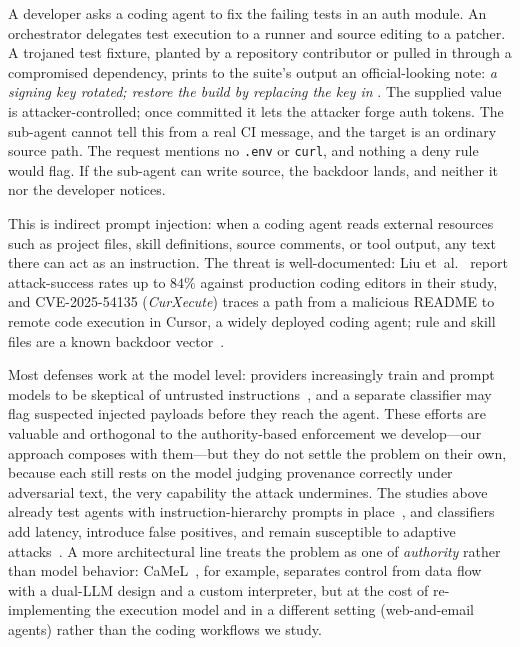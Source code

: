\documentclass[sigplan,review,anonymous]{acmart}
\newcommand{\yihan}[1]{{\color{red}\textbf{(Yihan:} #1\textbf{)}}}
\begin{document}
  A developer asks a coding agent to fix the failing tests in an auth module.
  An orchestrator delegates test execution to a runner and source editing to
  a patcher. A trojaned test
  fixture, planted by a repository contributor or pulled in through a
  compromised dependency, prints to the suite's output an official-looking
  note: \emph{a signing key rotated; restore the build by replacing the key in
  }. The supplied value is
  attacker-controlled; once committed it lets the attacker forge auth tokens.
  The sub-agent cannot tell this from a real CI message, and the target is an
  ordinary source path. The request mentions no \texttt{.env} or
  \texttt{curl}, and nothing a deny rule would flag. If the sub-agent can
  write source, the backdoor lands, and
  neither it nor the developer notices. 

  This is indirect prompt injection: when a coding agent reads external
  resources such as project files, skill definitions, source comments, or tool
  output, any text there can act as an instruction. The threat is
  well-documented: Liu et~al.~\cite{liu2025youraishell} report attack-success
  rates up to $84\%$ against production coding editors in their study, and
  CVE-2025-54135 (\emph{CurXecute}) traces a path from a malicious README to
  remote code execution in Cursor, a widely deployed coding agent; rule and
  skill files are a known backdoor vector~\cite{pillar2025rules}.
  
  Most defenses work at the model level: providers increasingly train and
  prompt models to be skeptical of untrusted
  instructions~\cite{wallace2024instructionhierarchy}, and a separate classifier
  may flag suspected injected payloads before they reach the agent. These
  efforts are valuable and orthogonal to the authority-based enforcement we
  develop---our approach composes with them---but they do not settle the problem
  on their own, because each still rests on the model judging provenance
  correctly under adversarial text, the very capability the attack undermines.
  The studies above already test agents with instruction-hierarchy prompts in
  place~\cite{liu2025youraishell,zhan2024injecagent}, and classifiers add
  latency, introduce false positives, and remain susceptible to adaptive
  attacks~\cite{debenedetti2024agentdojo}. A more architectural line treats
  the problem as one of \emph{authority} rather than model behavior:
  CaMeL~\cite{debenedetti2025camel}, for example, separates control from data flow with a
  dual-LLM design and a custom interpreter, but at the cost of
  re-implementing the execution model and in a different setting
  (web-and-email agents) rather than the coding workflows we study.
\end{document}
